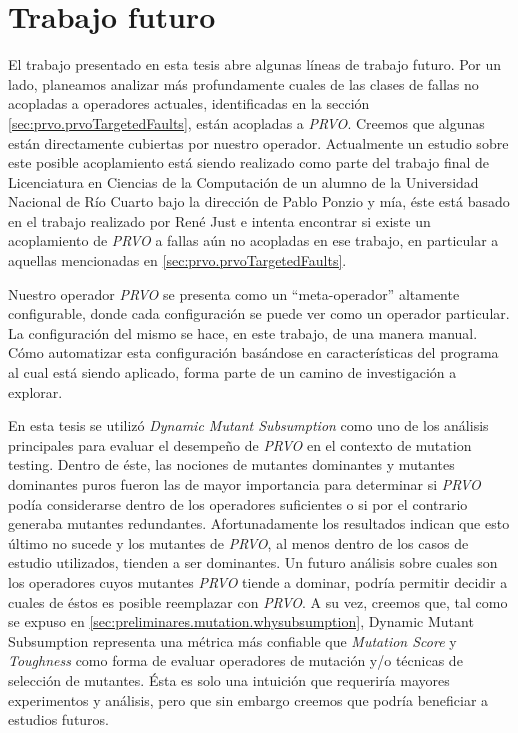 \chapter[Trabajo futuro]{Trabajo futuro}
\label{cap:futurework}

El trabajo presentado en esta tesis abre algunas l\'ineas de trabajo futuro. Por un lado, planeamos analizar m\'as profundamente cuales de las clases de fallas no acopladas a operadores actuales, identificadas en la secci\'on \ref{sec:prvo.prvoTargetedFaults}, est\'an acopladas a \emph{PRVO}. Creemos que algunas est\'an directamente cubiertas por nuestro operador. Actualmente un estudio sobre este posible acoplamiento est\'a siendo realizado como parte del trabajo final de Licenciatura en Ciencias de la Computaci\'on de un alumno de la Universidad Nacional de R\'io Cuarto bajo la direcci\'on de Pablo Ponzio y m\'ia, \'este est\'a basado en el trabajo realizado por Ren\'e Just \cite{bibliography.mutation.evaluation.valid-substitute} e intenta encontrar si existe un acoplamiento de \emph{PRVO} a fallas a\'un no acopladas en ese trabajo, en particular a aquellas mencionadas en \ref{sec:prvo.prvoTargetedFaults}.

Nuestro operador \emph{PRVO} se presenta como un ``meta-operador'' altamente configurable, donde cada configuraci\'on se puede ver como un operador particular. La configuraci\'on del mismo se hace, en este trabajo, de una manera manual. C\'omo automatizar esta configuraci\'on bas\'andose en caracter\'isticas del programa al cual est\'a siendo aplicado, forma parte de un camino de investigaci\'on a explorar.

En esta tesis se utiliz\'o \emph{Dynamic Mutant Subsumption} como uno de los an\'alisis principales para evaluar el desempe\~no de \emph{PRVO} en el contexto de mutation testing. Dentro de \'este, las nociones de mutantes dominantes y mutantes dominantes puros fueron las de mayor importancia para determinar si \emph{PRVO} pod\'ia considerarse dentro de los operadores suficientes o si por el contrario generaba mutantes redundantes. Afortunadamente los resultados indican que esto \'ultimo no sucede y los mutantes de \emph{PRVO}, al menos dentro de los casos de estudio utilizados, tienden a ser dominantes. Un futuro an\'alisis sobre cuales son los operadores cuyos mutantes \emph{PRVO} tiende a dominar, podr\'ia permitir decidir a cuales de \'estos es posible reemplazar con \emph{PRVO}. A su vez, creemos que, tal como se expuso en \ref{sec:preliminares.mutation.whysubsumption}, Dynamic Mutant Subsumption representa una m\'etrica m\'as confiable que \emph{Mutation Score} y \emph{Toughness} como forma de evaluar operadores de mutaci\'on y/o t\'ecnicas de selecci\'on de mutantes. \'Esta es solo una intuici\'on que requerir\'ia mayores experimentos y an\'alisis, pero que sin embargo creemos que podr\'ia beneficiar a estudios futuros. 

